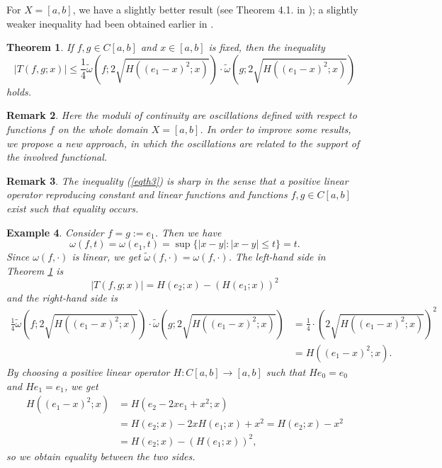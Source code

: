 \documentclass[12pt,leqno,a4paper,dvips,twoside]{article}
\newtheorem{thm}{Theorem}[section]
\newtheorem{rema}[thm]{Remark}%
\newtheorem{exem}[thm]{Example}%
\begin{document}
{For $X=[a,b]$, we have a slightly better result (see Theorem 4.1. in \cite{rusu:2011}); a slightly weaker inequality had
been obtained earlier in \cite{acugora:2011}.
\begin{thm}\label{th3}
	If $f,g\in C[a,b]$ and $x\in [a,b]$ is fixed, then the inequality
		\begin{equation}\label{eqth3}
			\left|T(f,g;x)\right|\leq \frac{1}{4}\widetilde{\omega}\left(f;2\sqrt{H((e_1-x)^2;x)}\right)\cdot
			\widetilde{\omega}\left(g;2\sqrt{H((e_1-x)^2;x)}\right)
		\end{equation} 
	holds.
\end{thm}

\begin{rema}
	Here the moduli of continuity are oscillations defined with respect to functions $f$ on the whole domain $X=[a,b]$. In order to improve some results, we propose a new approach, in which the oscillations are related to the support of the involved functional. 
\end{rema}

\begin{rema}
	The inequality (\ref{eqth3}) is sharp in the sense that a positive linear operator reproducing constant and linear functions and functions $f,g\in C[a,b]$ exist such that equality occurs.
\end{rema}

\begin{exem}
	Consider $f=g:=e_1$. Then we have
		\begin{equation*}	
			\omega(f,t)=\omega(e_1,t)=\sup\{\left|x-y\right|:\left|x-y\right|\leq t\}=t. 
		\end{equation*}	
	Since $\omega(f,\cdot)$ is linear, we get $\widetilde{\omega}(f,\cdot)=\omega(f,\cdot)$. 
	The left-hand side in Theorem \ref{th3} is
		\begin{equation*}
			\left|T(f,g;x)\right|=H(e_2;x)-(H(e_1;x))^2
		\end{equation*}
	and the right-hand side is
		\begin{align*}
			\frac{1}{4}\widetilde{\omega}\left(f;2\sqrt{H((e_1-x)^2;x)}\right)\cdot
			\widetilde{\omega}\left(g;2\sqrt{H((e_1-x)^2;x)}\right)&=\frac{1}{4}\cdot (2\sqrt{H((e_1-x)^2;x)})^2\\
			&=H((e_1-x)^2;x).
		\end{align*}
	By choosing a positive linear operator $H:C[a,b]\to [a,b]$ such that $He_0=e_0$ and $He_1=e_1$, we get
		\begin{align*}
			H((e_1-x)^2;x)&=H(e_2-2xe_1+x^2;x)\\
			&=H(e_2;x)-2xH(e_1;x)+x^2=H(e_2;x)-x^2\\
			&=H(e_2;x)-(H(e_1;x))^2,
		\end{align*}
	so we obtain equality between the two sides.
\end{exem}

}
\end{document}
